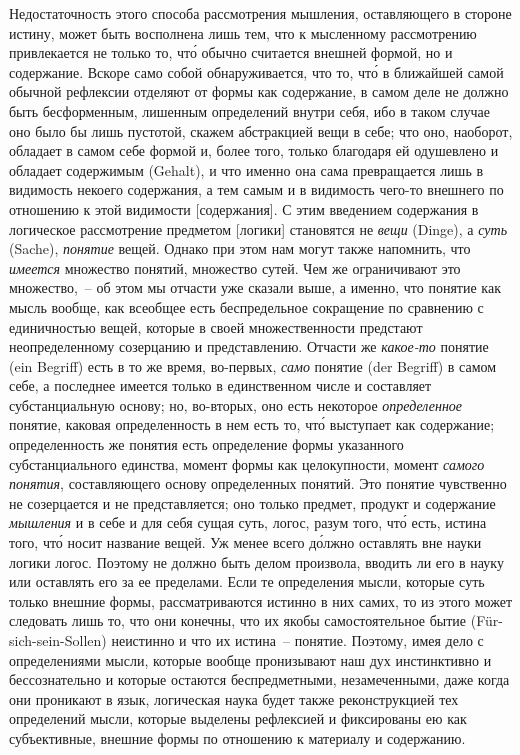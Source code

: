 Недостаточность этого способа рассмотрения мышления,
оставляющего в стороне истину, может быть восполнена
лишь тем, что к мысленному рассмотрению привлекается
не только то, чт\'о обычно считается внешней формой,
но и содержание. Вскоре само собой обнаруживается,
что то, чт\'о в ближайшей самой обычной рефлексии отделяют
от формы как содержание, в самом деле не должно
быть бесформенным, лишенным определений внутри себя,
ибо в таком случае оно было бы лишь пустотой, скажем
абстракцией вещи в себе; что оно, наоборот, обладает в
самом себе формой и, более того, только благодаря ей
одушевлено и обладает содержимым (Gehalt), и что именно
она сама превращается лишь в видимость некоего содержания,
а тем самым и в видимость чего-то внешнего
по отношению к этой видимости [содержания]. С этим
введением содержания в логическое рассмотрение предметом
[логики] становятся не \emph{вещи} (Dinge), а \emph{суть}
(Sache), \emph{понятие} вещей. Однако при этом нам могут также
напомнить, что \emph{имеется} множество понятий, множество
сутей. Чем же ограничивают это множество,~-- об
этом мы отчасти уже сказали выше, а именно, что понятие
как мысль вообще, как всеобщее есть беспредельное сокращение
по сравнению с единичностью вещей, которые в своей
множественности предстают неопределенному созерцанию
и представлению. Отчасти же \emph{какое-то} понятие (ein Begriff)
есть в то же время, во-первых, \emph{само} понятие (der
Begriff) в самом себе, а последнее имеется только в единственном
числе и составляет субстанциальную основу; но,
во-вторых, оно есть некоторое \emph{определенное} понятие, каковая
определенность в нем есть то, чт\'о выступает как
содержание; определенность же понятия есть определение
формы указанного субстанциального единства, момент
формы как целокупности, момент \emph{самого понятия}, составляющего
основу определенных понятий. Это понятие чувственно
не созерцается и не представляется; оно только
предмет, продукт и содержание \emph{мышления} и в себе и для
себя сущая суть, логос, разум того, чт\'о есть, истина того,
чт\'о носит название вещей. Уж менее всего д\'олжно оставлять
вне науки логики логос. Поэтому не должно быть
делом произвола, вводить ли его в науку или оставлять его
за ее пределами. Если те определения мысли, которые суть
только внешние формы, рассматриваются истинно в них
самих, то из этого может следовать лишь то, что они конечны,
что их якобы самостоятельное бытие (Für-sich-sein-Sollen)
неистинно и что их истина~-- понятие. Поэтому,
имея дело с определениями мысли, которые вообще
пронизывают наш дух инстинктивно и бессознательно и
которые остаются беспредметными, незамеченными, даже
когда они проникают в язык, логическая наука будет также
реконструкцией тех определений мысли, которые выделены
рефлексией и фиксированы ею как субъективные,
внешние формы по отношению к материалу и содержанию.

